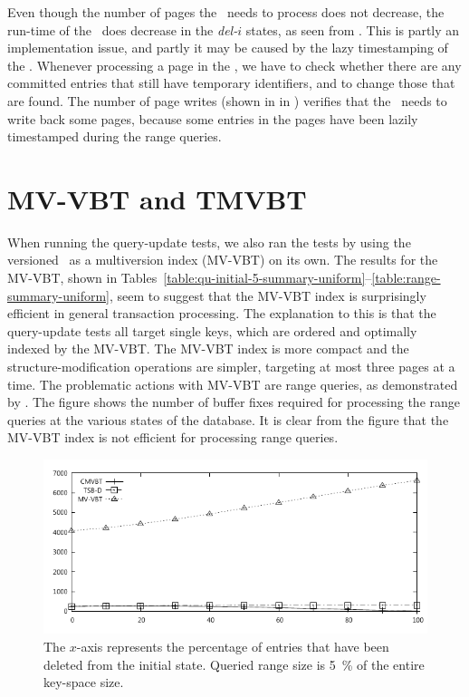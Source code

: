 Even though the number of pages the \TSBtree\ needs to process does 
not decrease, the run-time of the \TSBtree\ does decrease in the
\emph{del-$i$} states, as seen from .
This is partly an implementation issue, and partly it may be caused by the
lazy timestamping of the \TSBtree.
Whenever processing a page in the \TSBtree, we have to check whether
there are any committed entries that still have temporary identifiers, and to
change those that are found. 
The number of page writes (shown in
 in
) verifies that the \TSBtree\ needs to
write back some pages, because some entries in the pages have been lazily
timestamped during the range queries.



\section{MV-VBT and TMVBT}
\label{sec:performance:other}

When running the query-update tests, we also ran the tests by using the 
versioned \Btree\ as a multiversion index (MV-VBT) on its own.
The results for the MV-VBT, shown in
Tables~\ref{table:qu-initial-5-summary-uniform}--\ref{table:range-summary-uniform},
seem to suggest that the MV-VBT index
is surprisingly efficient in general transaction processing. 
The explanation to this is that the query-update tests all target single
keys, which are ordered and optimally indexed by the MV-VBT\@.
The MV-VBT index is more compact and the structure-modification operations
are simpler, targeting at most three pages at a time.
The problematic actions with MV-VBT are range queries, as demonstrated
by .
The figure shows the number of buffer fixes required for processing the range
queries at the various states of the database.
It is clear from the figure that the MV-VBT index is not efficient for
processing range queries.

\begin{figure}[!htb]
\begin{center}
\includegraphics[width=\testimagewidth]{images/tests/uniform/range-comparison-fix}
%
{The $x$-axis represents the percentage of entries that have been deleted
from the initial state.
Queried range size is \SI{5}{\percent} of the entire key-space size.}
\label{fig:range-comparison-fix}
\end{center}
\end{figure}

